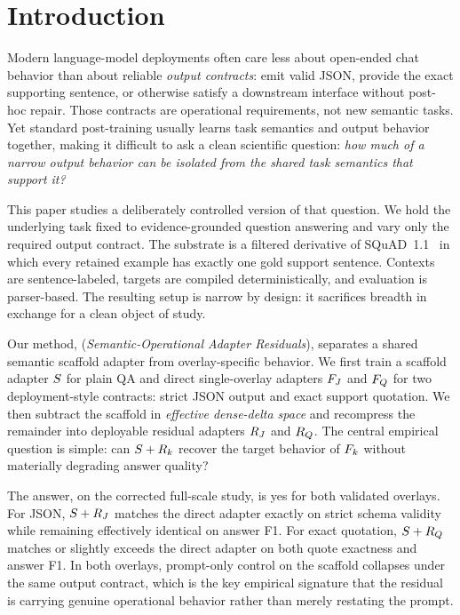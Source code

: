 
\section{Introduction}

Modern language-model deployments often care less about open-ended chat behavior than about reliable \emph{output contracts}: emit valid JSON, provide the exact supporting sentence, or otherwise satisfy a downstream interface without post-hoc repair. Those contracts are operational requirements, not new semantic tasks. Yet standard post-training usually learns task semantics and output behavior together, making it difficult to ask a clean scientific question: \emph{how much of a narrow output behavior can be isolated from the shared task semantics that support it?}

This paper studies a deliberately controlled version of that question. We hold the underlying task fixed to evidence-grounded question answering and vary only the required output contract. The substrate is a filtered derivative of SQuAD~1.1~\citep{rajpurkar2016squad} in which every retained example has exactly one gold support sentence. Contexts are sentence-labeled, targets are compiled deterministically, and evaluation is parser-based. The resulting setup is narrow by design: it sacrifices breadth in exchange for a clean object of study.

Our method, \method{} (\emph{Semantic-Operational Adapter Residuals}), separates a shared semantic scaffold adapter from overlay-specific behavior. We first train a scaffold adapter $S$ for plain QA and direct single-overlay adapters $F_{J}$ and $F_{Q}$ for two deployment-style contracts: strict JSON output and exact support quotation. We then subtract the scaffold in \emph{effective dense-delta space} and recompress the remainder into deployable residual adapters $R_{J}$ and $R_{Q}$. The central empirical question is simple: can $S + R_{k}$ recover the target behavior of $F_{k}$ without materially degrading answer quality?

The answer, on the corrected full-scale study, is yes for both validated overlays. For JSON, $S + R_{J}$ matches the direct adapter exactly on strict schema validity while remaining effectively identical on answer F1. For exact quotation, $S + R_{Q}$ matches or slightly exceeds the direct adapter on both quote exactness and answer F1. In both overlays, prompt-only control on the scaffold collapses under the same output contract, which is the key empirical signature that the residual is carrying genuine operational behavior rather than merely restating the prompt.

